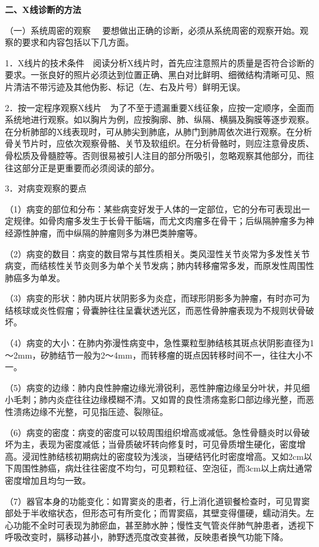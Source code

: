 \textbf{二、X线诊断的方法}

（一）{系统周密的观察}
　要想做出正确的诊断，必须从系统周密的观察开始。观察的要求和内容包括以下几方面。

1．X线片的技术条件　阅读分析X线片时，首先应注意照片的质量是否符合诊断的要求。一张良好的照片必须达到位置正确、黑白对比鲜明、细微结构清晰可见、照片清洁不带污迹及其他伪影、标记（左、右及片号）鲜明无误。

2．按一定程序观察X线片　为了不至于遗漏重要X线征象，应按一定顺序，全面而系统地进行观察。如以胸片为例，应按胸廓、肺、纵隔、横膈及胸膜等逐步观察。在分析肺部的X线表现时，可从肺尖到肺底，从肺门到肺周依次进行观察。在分析骨关节片时，应依次观察骨骼、关节及软组织。在分析骨骼时，则应注意骨皮质、骨松质及骨髓腔等。否则很易被引人注目的部分所吸引，忽略观察其他部分，而往往这部分正是更重要而必须阅读的部分。

3．对病变观察的要点

（1）病变的部位和分布：某些病变好发于人体的一定部位，它的分布可表现出一定规律。如骨肉瘤多发生于长骨干骺端，而尤文肉瘤多在骨干；后纵隔肿瘤多为神经源性肿瘤，而中纵隔的肿瘤则多为淋巴类肿瘤等。

（2）病变的数目：病变的数目常与其性质相关。类风湿性关节炎常为多发性关节病变，而结核性关节炎则多为单个关节发病；肺内转移瘤常多发，而原发性周围性肺癌多为单发。

（3）病变的形状：肺内斑片状阴影多为炎症，而球形阴影多为肿瘤，有时亦可为结核球或炎性假瘤；骨囊肿往往呈囊状透光区，而恶性骨肿瘤表现为不规则状骨破坏。

（4）病变的大小：在肺内弥漫性病变中，急性粟粒型肺结核其斑点状阴影直径为1～2mm，矽肺结节一般为2～4mm，而转移瘤的斑点因转移时间不一，往往大小不一。

（5）病变的边缘：肺内良性肿瘤边缘光滑锐利，恶性肿瘤边缘呈分叶状，并见细小毛刺；肺内炎症往往边缘模糊不清。又如胃的良性溃疡龛影口部边缘光整，而恶性溃疡边缘不光整，可见指压迹、裂隙征。

（6）病变的密度：病变的密度可以较周围组织增高或减低。急性骨髓炎时以骨破坏为主，表现为密度减低；当骨质破坏转向修复时，可见骨质增生硬化，密度增高。浸润性肺结核初期病灶的密度较为浅淡，当硬结钙化时密度增高。又如2cm以下周围性肺癌，病灶往往密度不均匀，可见颗粒征、空泡征，而3cm以上病灶通常密度增加且均匀一致。

（7）器官本身的功能变化：如胃窦炎的患者，行上消化道钡餐检查时，可见胃窦部处于半收缩状态，但形态可有所变化；而胃窦癌，其壁变得僵硬，蠕动消失。左心功能不全时可表现为肺瘀血，甚至肺水肿；慢性支气管炎伴肺气肿患者，透视下呼吸改变时，膈移动甚小，肺野透亮度改变甚微，反映患者换气功能下降。

